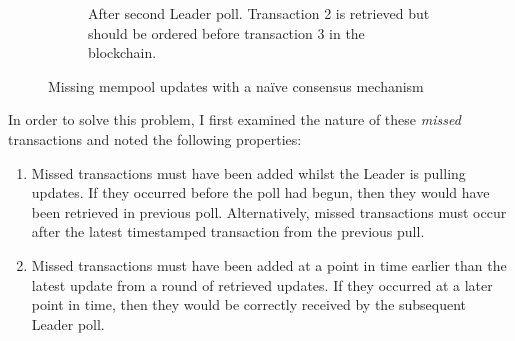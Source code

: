 \documentclass[12pt,a4paper,twoside,openright]{report}
\begin{document}
\begin{figure}
\begin{subfigure}[b]{0.45\textwidth}
			\caption{After second Leader poll. Transaction 2 is retrieved but should be ordered before transaction 3 in the blockchain.}
		\end{subfigure}
		\caption{Missing mempool updates with a na\"{i}ve consensus mechanism}	
		\label{fig:readremotepartudpatesbroke}
	\end{figure}

	In order to solve this problem, I first examined the nature of these \textit{missed} transactions and noted the following properties:
	\begin{enumerate}
		\item Missed transactions must have been added whilst the Leader is pulling updates. 
		If they occurred before the poll had begun, then they would have been retrieved in previous poll. 
		Alternatively, missed transactions must occur after the latest timestamped transaction from the previous pull. 
		\item Missed transactions must have been added at a point in time earlier than the latest update from a round of retrieved updates.
		If they occurred at a later point in time, then they would be correctly received by the subsequent Leader poll.
	\end{enumerate}
\end{document}
